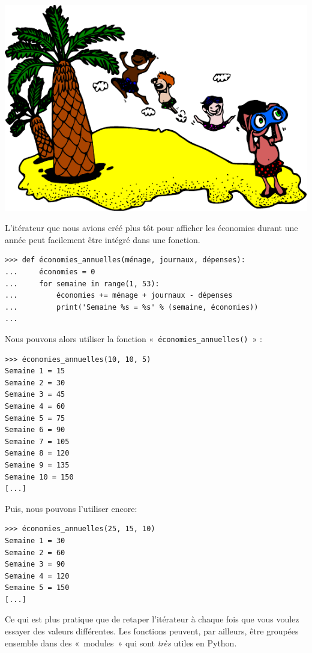 \begin{center}
 \includegraphics{images/ile.pdf}
\end{center}

L'itérateur que nous avions créé plus tôt pour afficher les économies durant une année peut facilement être intégré dans une fonction.

\begin{Verbatim}[frame=single,rulecolor=\color{mbleu}, label=à taper]
>>> def économies_annuelles(ménage, journaux, dépenses):
...     économies = 0
...     for semaine in range(1, 53):
...         économies += ménage + journaux - dépenses
...         print('Semaine %s = %s' % (semaine, économies))
...
\end{Verbatim}

Nous pouvons alors utiliser la fonction «~\texttt{économies\_annuelles()}~» :

\begin{Verbatim}[frame=single,rulecolor=\color{mbleu}, label=à taper]
>>> économies_annuelles(10, 10, 5)
Semaine 1 = 15
Semaine 2 = 30
Semaine 3 = 45
Semaine 4 = 60
Semaine 5 = 75
Semaine 6 = 90
Semaine 7 = 105
Semaine 8 = 120
Semaine 9 = 135
Semaine 10 = 150
[...]
\end{Verbatim}

Puis, nous pouvons l'utiliser encore:

\begin{Verbatim}[frame=single,rulecolor=\color{mbleu}, label=à taper]
>>> économies_annuelles(25, 15, 10)
Semaine 1 = 30
Semaine 2 = 60
Semaine 3 = 90
Semaine 4 = 120
Semaine 5 = 150
[...]
\end{Verbatim}

Ce qui est plus pratique que de retaper l'itérateur à chaque fois que vous voulez essayer des valeurs différentes.
Les fonctions peuvent, par ailleurs, être groupées ensemble dans des «~modules~»  qui sont \emph{très} utiles en Python.\\

